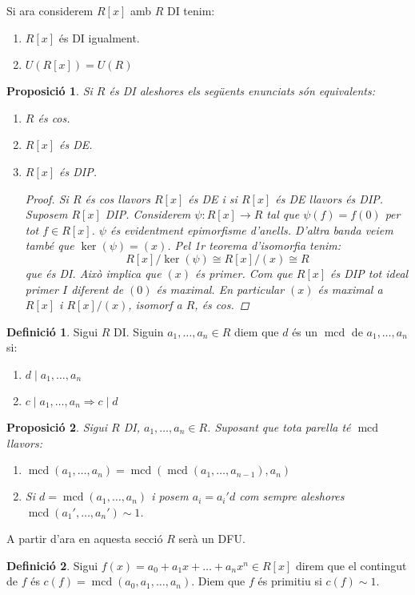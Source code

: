 \documentclass[a4paper,11pt]{report}
\DeclareMathOperator{\mcd}{mcd}
\newcommand{\im}{\Rightarrow}
\theoremstyle{theorem}
\newtheorem{proposicio}{\normalfont \sffamily\bfseries Proposició}[section]
\theoremstyle{definition}
\newtheorem{definicio}{\normalfont\sffamily\bfseries Definició}[section]
\begin{document}
Si ara considerem $R[x]$ amb $R$ DI tenim:
\begin{enumerate}
	\item $R[x]$ és DI igualment.\item $U(R[x])=U(R)$
\end{enumerate}
\begin{proposicio}
	Si $R$ és DI aleshores els següents enunciats són equivalents:\begin{enumerate}
		\item $R$ és cos.
		\item $R[x]$ és DE.
		\item $R[x]$ és DIP.
		\begin{proof}
			Si $R$ és cos llavors $R[x]$ és DE i si $R[x]$ és DE llavors és DIP. Suposem $R[x]$ DIP. Considerem $\psi:R[x]\longrightarrow R$ tal que $\psi(f)=f(0)$ per tot $f\in R[x]$. $\psi$ és evidentment epimorfisme d'anells. D'altra banda veiem també que $\ker(\psi)=(x)$. Pel 1r teorema d'isomorfia tenim:
		$$R[x]/\ker(\psi)\cong R[x]/(x)\cong R$$ que és DI. Això implica que $(x)$ és primer. Com que $R[x]$ és DIP tot ideal primer $I$ diferent de $(0)$ és maximal. En particular $(x)$ és maximal a $R[x]$ i $R[x]/(x)$, isomorf a $R$, és cos. 	\end{proof}
	\end{enumerate}
\end{proposicio}
\begin{definicio}
	Sigui $R$ DI. Siguin $a_1,\ldots,a_n\in R$ diem que $d$ és un $\mcd$ de $a_1,\ldots,a_n$ si:
	\begin{enumerate}
		\item $d\mid a_1,\ldots,a_n$
		\item $c\mid a_1,\ldots,a_n\im c\mid d$
	\end{enumerate}
\end{definicio}
\begin{proposicio}
	Sigui $R$ DI, $a_1,\ldots,a_n\in R$. Suposant que tota parella té $\mcd$ llavors:\begin{enumerate}
		\item $\mcd(a_1,\ldots,a_n)=\mcd(\mcd(a_1,\ldots,a_{n-1}),a_n)$
		\item Si $d=\mcd(a_1,\ldots,a_n)$ i posem $a_i=a_i' d$ com sempre aleshores $\mcd(a_1',\ldots,a_n')\sim 1$.
	\end{enumerate}
\end{proposicio}
A partir d'ara en aquesta secció $R$ serà un DFU.
\begin{definicio}
Sigui $f(x)=a_0+a_1x+\ldots+a_nx^n\in R[x]$	direm que el contingut de $f$ és $c(f)=\mcd(a_0,a_1,\ldots,a_n)$. Diem que $f$ és primitiu si $c(f)\sim 1$.
\end{definicio}
\end{document}
